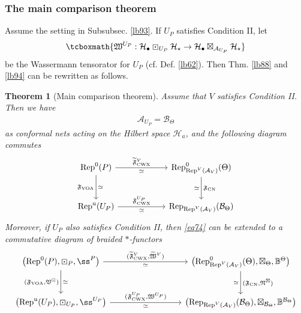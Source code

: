 \documentclass[11pt,b5paper,notitlepage]{article}
\theoremstyle{definition}
\theoremstyle{plain}
\newtheorem{thm}[df]{Theorem}
\newcommand{\fk}{\mathfrak}
\newcommand{\mc}{\mathcal}
\newcommand{\wtd}{\widetilde}
\newcommand{\Rep}{\mathrm{Rep}}
\newcommand{\blt}{\bullet}
\newcommand{\CWX}{{\scriptscriptstyle \mathrm{CWX}}}
\newcommand{\tFVCWX}{{\widetilde{\mathfrak F}^V_{\scriptscriptstyle \mathrm{CWX}}}}
\newcommand{\VOA}{{\scriptscriptstyle \mathrm{VOA}}}
\newcommand{\CN}{{\scriptscriptstyle \mathrm{CN}}}
\newcommand{\RepUP}{\mathrm{Rep}^{\mathrm u}(U_P)}
\numberwithin{equation}{section}
\begin{document}
\subsubsection{The main comparison theorem}

Assume the setting in Subsubsec. \ref{lb93}. If $U_P$ satisfies Condition II, let
\begin{align*}
\tcboxmath{\fk W^{U_P}:\mc H_\blt\boxdot_{U_P}\mc H_\star\rightarrow\mc H_\blt\boxtimes_{\mc A_{U_P}}\mc H_\star}
\end{align*}
be the Wassermann tensorator for $U_P$ (cf. Def. \ref{lb62}). Then Thm. \ref{lb88} and \ref{lb94} can be rewritten as follows.

\begin{thm}[Main comparison theorem]\label{lb95}
Assume that $V$ satisfies Condition II. Then we have
\begin{align*}
\mc A_{U_P}=\mc B_\Theta
\end{align*}
as conformal nets acting on the Hilbert space $\mc H_a$, and the following diagram commutes
\begin{equation}\label{eq74}
\begin{tikzcd}[row sep=large,column sep=2cm]
\Rep^0(P) \arrow[r,"\tFVCWX","\simeq"'] \arrow[d,"{\fk F_\VOA}"',"\simeq"] & \Rep^0_{\Rep^V(\mc A_V)}(\Theta) \arrow[d,"{\fk F_\CN}","\simeq"'] \\
\RepUP \arrow[r,"{\fk F^{U_P}_\CWX}","\simeq"']           & \Rep_{\Rep^V(\mc A_V)}(\mc B_\Theta)          
\end{tikzcd}
\end{equation}
Moreover, if $U_P$ also satisfies Condition II, then \eqref{eq74} can be extended to a commutative diagram of braided $*$-functors
\begin{equation}\label{eq81}
\begin{tikzcd}[row sep=large,column sep=3cm]
\big(\Rep^0(P),\boxdot_P,\ss^P\big) \arrow[r,"{(\tFVCWX,\wtd{\fk W}^V)}","\simeq"'] \arrow[d,"{(\fk F_\VOA,\fk V^\boxdot)}"',"\simeq"] & \big(\Rep^0_{\Rep^V(\mc A_V)}(\Theta),\boxtimes_\Theta,\mathbb B^\Theta \big)\arrow[d,"{(\fk F_\CN,\fk N^\boxtimes)}","\simeq"'] \\
\big(\RepUP,\boxdot_{U_P},\ss^{U_P} \big)\arrow[r,"{(\fk F^{U_P}_\CWX,\fk W^{U_P})}","\simeq"']           & \big(\Rep_{\Rep^V(\mc A_V)}(\mc B_\Theta),\boxtimes_{\mc B_\Theta},\mathbb B^{\mc B_\Theta} \big)         
\end{tikzcd}
\end{equation}
\end{thm}
\end{document}
